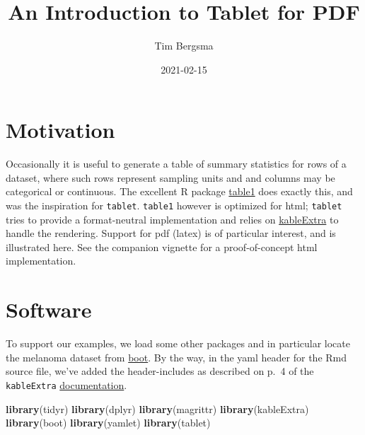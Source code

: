 \documentclass[
]{article}
\title{An Introduction to Tablet for PDF}
\author{Tim Bergsma}
\date{2021-02-15}
\newenvironment{Shaded}{\begin{snugshade}}{\end{snugshade}}
\newcommand{\KeywordTok}[1]{\textcolor[rgb]{0.13,0.29,0.53}{\textbf{#1}}}
\newcommand{\NormalTok}[1]{#1}
\newcommand{\OperatorTok}[1]{\textcolor[rgb]{0.81,0.36,0.00}{\textbf{#1}}}
\newcommand{\StringTok}[1]{\textcolor[rgb]{0.31,0.60,0.02}{#1}}
\begin{document}
\maketitle

{
\hypersetup{linkcolor=}
\setcounter{tocdepth}{2}
\tableofcontents
}
\hypertarget{motivation}{%
\section{Motivation}\label{motivation}}

Occasionally it is useful to generate a table of summary statistics for
rows of a dataset, where such rows represent sampling units and and
columns may be categorical or continuous. The excellent R package
\href{https://CRAN.R-project.org/package=table1}{table1} does exactly
this, and was the inspiration for \texttt{tablet}. \texttt{table1}
however is optimized for html; \texttt{tablet} tries to provide a
format-neutral implementation and relies on
\href{https://CRAN.R-project.org/package=kableExtra}{kableExtra} to
handle the rendering. Support for pdf (latex) is of particular interest,
and is illustrated here. See the companion vignette for a
proof-of-concept html implementation.

\hypertarget{software}{%
\section{Software}\label{software}}

To support our examples, we load some other packages and in particular
locate the melanoma dataset from
\href{https://CRAN.R-project.org/package=boot}{boot}. By the way, in the
yaml header for the Rmd source file, we've added the header-includes as
described on p.~4 of the \texttt{kableExtra}
\href{https://haozhu233.github.io/kableExtra/awesome_table_in_pdf.pdf}{documentation}.

\begin{Shaded}
\begin{Highlighting}[]
\KeywordTok{library}\NormalTok{(tidyr)}
\KeywordTok{library}\NormalTok{(dplyr)}
\KeywordTok{library}\NormalTok{(magrittr)}
\KeywordTok{library}\NormalTok{(kableExtra)}
\KeywordTok{library}\NormalTok{(boot)}
\KeywordTok{library}\NormalTok{(yamlet)}
\KeywordTok{library}\NormalTok{(tablet)}
\end{Highlighting}
\end{Shaded}

\begin{Shaded}
\end{Shaded}
\end{document}
